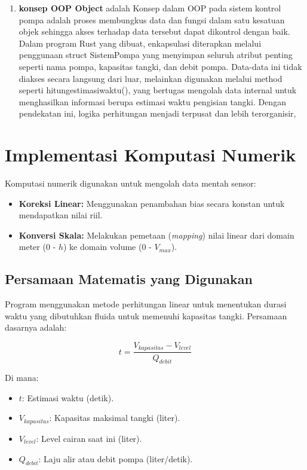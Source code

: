\documentclass[12pt,a4paper]{article}
\begin{document}
\begin{enumerate}
    \item \textbf{konsep OOP Object}
adalah Konsep dalam OOP pada sistem kontrol pompa adalah proses membungkus data dan fungsi dalam satu kesatuan objek sehingga akses terhadap data tersebut dapat dikontrol dengan baik. Dalam program Rust yang dibuat, enkapsulasi diterapkan melalui penggunaan struct SistemPompa yang menyimpan seluruh atribut penting seperti nama pompa, kapasitas tangki, dan debit pompa. Data-data ini tidak diakses secara langsung dari luar, melainkan digunakan melalui method seperti hitungestimasiwaktu(), yang bertugas mengolah data internal untuk menghasilkan informasi berupa estimasi waktu pengisian tangki. Dengan pendekatan ini, logika perhitungan menjadi terpusat dan lebih terorganisir, 
  
    
\end{enumerate}


\section{Implementasi Komputasi Numerik}
Komputasi numerik digunakan untuk mengolah data mentah sensor:
\begin{itemize}
    \item \textbf{Koreksi Linear:} Menggunakan penambahan bias secara konstan untuk mendapatkan nilai riil.
    \item \textbf{Konversi Skala:} Melakukan pemetaan (\textit{mapping}) nilai linear dari domain meter (0 - $h$) ke domain volume (0 - $V_{max}$).
\end{itemize}

\subsection*{Persamaan Matematis yang Digunakan}
Program menggunakan metode perhitungan linear untuk menentukan durasi waktu yang dibutuhkan fluida untuk memenuhi kapasitas tangki. Persamaan dasarnya adalah:

\begin{equation}
    t = \frac{V_{kapasitas} - V_{level}}{Q_{debit}}
\end{equation}

Di mana:
\begin{itemize}
    \item $t$: Estimasi waktu (detik).
    \item $V_{kapasitas}$: Kapasitas maksimal tangki (liter).
    \item $V_{level}$: Level cairan saat ini (liter).
    \item $Q_{debit}$: Laju alir atau debit pompa (liter/detik).
\end{itemize}
\end{document}
